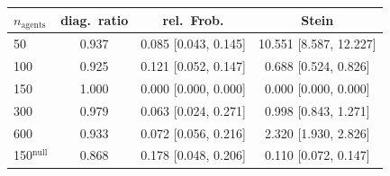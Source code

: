 \begin{tabular}{lccc}
\toprule
$n_{\mathrm{agents}}$ & diag.\ ratio & rel.\ Frob. & Stein \\
\midrule
50 & 0.937 & 0.085 [0.043, 0.145] & 10.551 [8.587, 12.227] \\
100 & 0.925 & 0.121 [0.052, 0.147] & 0.688 [0.524, 0.826] \\
150 & 1.000 & 0.000 [0.000, 0.000] & 0.000 [0.000, 0.000] \\
300 & 0.979 & 0.063 [0.024, 0.271] & 0.998 [0.843, 1.271] \\
600 & 0.933 & 0.072 [0.056, 0.216] & 2.320 [1.930, 2.826] \\
150$^{\mathrm{null}}$ & 0.868 & 0.178 [0.048, 0.206] & 0.110 [0.072, 0.147] \\
\bottomrule
\end{tabular}
